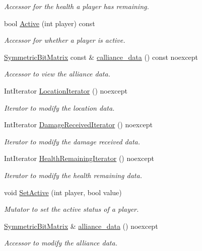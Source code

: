 \begin{DoxyCompactItemize}
\begin{DoxyCompactList}\small\item\em Accessor for the health a player has remaining. \end{DoxyCompactList}\item 
bool \hyperlink{classroundinfo_1_1_round_info_a03a7ee40677506160aef2766929e6105}{Active} (int player) const
\begin{DoxyCompactList}\small\item\em Accessor for whether a player is active. \end{DoxyCompactList}\item 
\hyperlink{class_symmetric_bit_matrix}{Symmetric\+Bit\+Matrix} const  \& \hyperlink{classroundinfo_1_1_round_info_a0944e6bf6facb52e9955695ea0b3feb3}{calliance\+\_\+data} () const noexcept
\begin{DoxyCompactList}\small\item\em Accessor to view the alliance data. \end{DoxyCompactList}\item 
Int\+Iterator \hyperlink{classroundinfo_1_1_round_info_ab9e17ca5d68f9981862cbf540cc0b297}{Location\+Iterator} () noexcept
\begin{DoxyCompactList}\small\item\em Iterator to modify the location data. \end{DoxyCompactList}\item 
Int\+Iterator \hyperlink{classroundinfo_1_1_round_info_a94ea1a09ae7680e74188296aef0b0d63}{Damage\+Received\+Iterator} () noexcept
\begin{DoxyCompactList}\small\item\em Iterator to modify the damage received data. \end{DoxyCompactList}\item 
Int\+Iterator \hyperlink{classroundinfo_1_1_round_info_a3a81f2d87bea27339f035201f1887423}{Health\+Remaining\+Iterator} () noexcept
\begin{DoxyCompactList}\small\item\em Iterator to modify the health remaining data. \end{DoxyCompactList}\item 
void \hyperlink{classroundinfo_1_1_round_info_a28d85479753dae18a6b2a27d048d2973}{Set\+Active} (int player, bool value)
\begin{DoxyCompactList}\small\item\em Mutator to set the active status of a player. \end{DoxyCompactList}\item 
\hyperlink{class_symmetric_bit_matrix}{Symmetric\+Bit\+Matrix} \& \hyperlink{classroundinfo_1_1_round_info_a9d5ae58298d3acd11377da7992235762}{alliance\+\_\+data} () noexcept
\begin{DoxyCompactList}\small\item\em Accessor to modify the alliance data. \end{DoxyCompactList}\end{DoxyCompactItemize}
